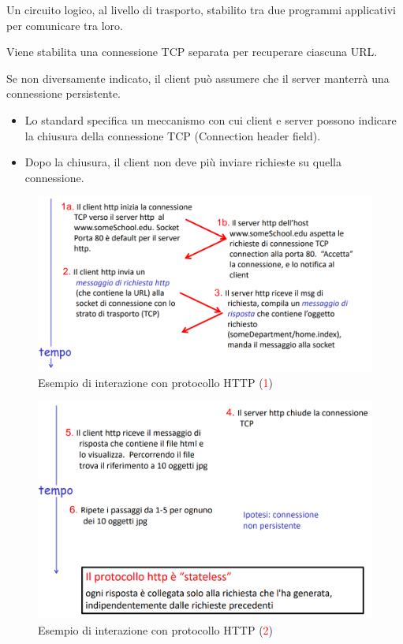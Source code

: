 \begin{definition}[Connessione]
    Un circuito logico, al livello di trasporto, stabilito tra due programmi applicativi per comunicare tra loro.    
\end{definition}
\begin{definition}
    Viene stabilita una connessione TCP separata per recuperare ciascuna URL.
\end{definition}
\begin{definition}
    Se non diversamente indicato, il client può assumere che il server manterrà una connessione persistente.
    \begin{itemize}
        \item Lo standard specifica un meccanismo con cui client e server possono indicare la chiusura della connessione TCP (Connection header field).
        \item Dopo la chiusura, il client non deve più inviare richieste su quella connessione.
    \end{itemize}
\end{definition}

\begin{figure}[h]
    \centering
    \includegraphics[scale=0.30]{Immagini/Esempio_richiesta_HTTP.png}
    \caption{Esempio di interazione con protocollo HTTP (\textcolor{red}{1})}
\end{figure}
\begin{figure}[h]
    \centering
    \includegraphics[scale=0.30]{Immagini/Esempio_richiesta_HTTP_2.png}
    \caption{Esempio di interazione con protocollo HTTP (\textcolor{red}{2})}
\end{figure}

